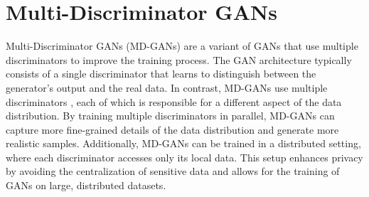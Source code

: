 \section{Multi-Discriminator GANs}
Multi-Discriminator GANs (MD-GANs) are a variant of GANs that use multiple discriminators to improve the training process. The GAN architecture typically consists of a single discriminator that learns to distinguish between the generator's output and the real data. In contrast, MD-GANs use multiple discriminators \cite{mdgan}, each of which is responsible for a different aspect of the data distribution. By training multiple discriminators in parallel, MD-GANs can capture more fine-grained details of the data distribution and generate more realistic samples. Additionally, MD-GANs can be trained in a distributed setting, where each discriminator accesses only its local data. This setup enhances privacy by avoiding the centralization of sensitive data and allows for the training of GANs on large, distributed datasets.
